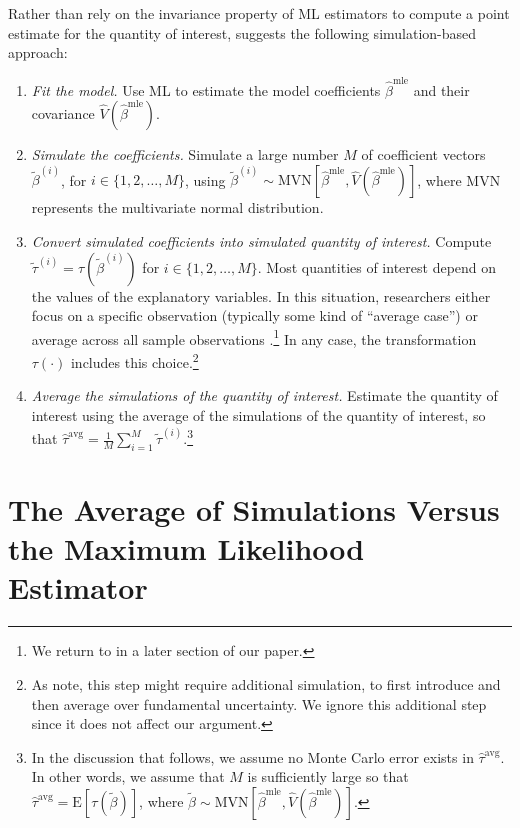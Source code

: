 \documentclass[11pt]{article}
\begin{document}
Rather than rely on the invariance property of ML estimators to compute a point estimate for the quantity of interest, \cite{KingTomzWittenberg2000} suggests the following simulation-based approach:\vspace{.1in}
\begin{enumerate}
\item \textit{Fit the model.}
Use ML to estimate the model coefficients $\hat{\beta}^{\text{mle}}$ and their covariance $\hat{V} \left( \hat{\beta}^{\text{mle}} \right)$.
\item \textit{Simulate the coefficients.}
Simulate a large number $M$ of coefficient vectors $\tilde{\beta}^{(i)}$, for $i \in \{1, 2,\ldots, M\}$, using $\tilde{\beta}^{(i)} \sim \text{MVN} \left[ \hat{\beta}^{\text{mle}}, \hat{V} \left( \hat{\beta}^{\text{mle}} \right) \right]$, where MVN represents the multivariate normal distribution.
\item \textit{Convert simulated coefficients into simulated quantity of interest.}
Compute $\tilde{\tau}^{(i)} = \tau \left( \tilde{\beta}^{(i)} \right)$ for $i \in \{1, 2,\ldots, M\}$.
Most quantities of interest depend on the values of the explanatory variables. In this situation, researchers either focus on a specific observation (typically some kind of ``average case'') or average across all sample observations \citep{HanmerKalkan2013}.\footnote{We return to \cite{HanmerKalkan2013} in a later section of our paper.} In any case, the transformation $\tau(\cdot)$ includes this choice.\footnote{As \cite{KingTomzWittenberg2000} note, this step might require additional simulation, to first introduce and then average over fundamental uncertainty. We ignore this additional step since it does not affect our argument.} \item \textit{Average the simulations of the quantity of interest.} Estimate the quantity of interest using the average of the simulations of the quantity of interest, so that $\hat{\tau}^{\text{avg}} = \frac{1}{M} \sum_{i = 1}^{M} \tilde{\tau}^{(i)}$.\footnote{In the discussion that follows, we assume no Monte Carlo error exists in $\hat{\tau}^{\text{avg}}$. In other words, we assume that $M$ is sufficiently large so that $\hat{\tau}^{\text{avg}} = \text{E}\left[ \tau \left(\tilde{\beta} \right) \right]$, where $\tilde{\beta} \sim \text{MVN} \left[ \hat{\beta}^{\text{mle}}, \hat{V} \left( \hat{\beta}^{\text{mle}} \right) \right]$.}\\
\end{enumerate}


\section*{The Average of Simulations Versus the Maximum Likelihood Estimator}
\end{document}
